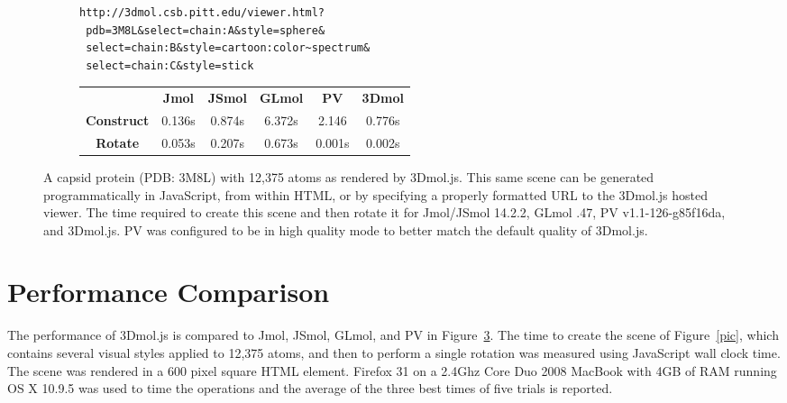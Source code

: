 \documentclass[]{bioinfo}
\begin{document}
\begin{figure}
\begin{minipage}[b]{\linewidth}
\begin{subfigure}[b]{\linewidth}
\end{subfigure} %
\begin{subfigure}[b]{\linewidth} \centering
\begin{verbatim}
http://3dmol.csb.pitt.edu/viewer.html?
 pdb=3M8L&select=chain:A&style=sphere&
 select=chain:B&style=cartoon:color~spectrum&
 select=chain:C&style=stick
\end{verbatim}
\caption{}\label{url}
\end{subfigure} %
\begin{subfigure}[b]{\linewidth} \centering
\begin{tabular}{cccccc}
 & \textbf{Jmol} & \textbf{JSmol} & \textbf{GLmol} &\textbf{PV} & \textbf{3Dmol} \\
\textbf{Construct} & 0.136s & 0.874s & 6.372s & 2.146 & 0.776s \\
\textbf{Rotate} & 0.053s & 0.207s & 0.673s & 0.001s & 0.002s
\end{tabular}
\caption{}\label{perf}
\end{subfigure}

\end{minipage}
\caption{ A capsid protein (PDB: 3M8L) with 12,375 atoms as rendered by 3Dmol.js.
This same scene can be generated  programmatically in JavaScript,  from
within HTML, or   by specifying a properly formatted URL to the 3Dmol.js hosted viewer.
 The time required to create this scene and then rotate it for Jmol/JSmol 14.2.2, GLmol .47, 
PV v1.1-126-g85f16da, and 3Dmol.js.  PV was configured to be in high quality mode to better match
the default quality of 3Dmol.js.
}
\end{figure}




\section{Performance Comparison}

The performance of 3Dmol.js is compared to Jmol, JSmol, GLmol, and PV in Figure~\ref{perf}.
The time to create the scene of Figure~\ref{pic}, which contains several visual styles applied to 12,375 atoms,
and then to perform a single rotation was measured using JavaScript wall clock time.  The scene was rendered in a 600 pixel square HTML element.
 Firefox 31 on a 2.4Ghz Core Duo 2008 MacBook with 4GB of RAM running OS X 10.9.5
was used to time the operations and the average of the three best times of five trials is reported.
\end{document}
